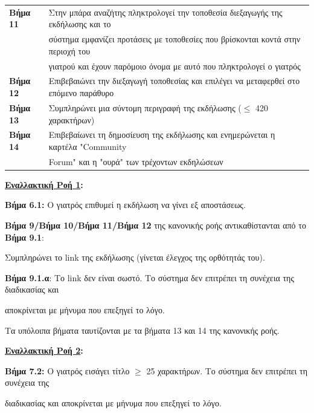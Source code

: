 \documentclass{article}
\newcommand\T{\rule{0pt}{2.6ex}}       %
\newcommand\B{\rule[-1.2ex]{0pt}{0pt}}
\begin{document}
\begin{center}
\begin{tabular}{|l|l|}
      \hline
       \textbf{Βήμα 11} & Στην μπάρα αναζήτης πληκτρολογεί την τοποθεσία διεξαγωγής της εκδήλωσης και το \T \\& σύστημα εμφανίζει προτάσεις με τοποθεσίες που βρίσκονται κοντά στην περιοχή του \\& γιατρού και έχουν παρόμοιο όνομα με αυτό που πληκτρολογεί ο γιατρός  \B \\
      \hline
       \textbf{Βήμα 12} & Επιβεβαιώνει την διεξαγωγή τοποθεσίας και επιλέγει να μεταφερθεί στο επόμενο παράθυρο\T\B \\
      \hline
       \textbf{Βήμα 13} & Συμπληρώνει μια σύντομη περιγραφή της εκδήλωσης ($\le$ 420 χαρακτήρων) \T\B \\
      \hline
       \textbf{Βήμα 14} & Επιβεβαίωνει τη δημοσίευση της εκδήλωσης και ενημερώνεται η καρτέλα "Community \T \\& Forum" και η "ουρά" των τρέχοντων εκδηλώσεων \B \\
      \hline
     \end{tabular}
 \end{center}
 
 \textbf{\underline{Εναλλακτική Ροή 1}:} \vspace{0.2cm}
\par \textbf{Βήμα 6.1:} Ο γιατρός επιθυμεί η εκδήλωση να γίνει εξ αποστάσεως.\vspace{0.1cm}

\textbf{Βήμα 9/Βήμα 10/Βήμα 11/Βήμα 12} της κανονικής ροής αντικαθίστανται από το \textbf{Βήμα 9.1}: \par Συμπληρώνει το link της εκδήλωσης (γίνεται έλεγχος της ορθότητάς του). \vspace{0.1cm}
\par \textbf{Βήμα 9.1.α}: Το link δεν είναι σωστό. Το σύστημα δεν επιτρέπει τη συνέχεια της διαδικασίας και \par αποκρίνεται με μήνυμα που επεξηγεί το λόγο. \vspace{0.1cm}

\par Τα υπόλοιπα βήματα ταυτίζονται με τα βήματα 13 και 14 της κανονικής ροής. \vspace{0.2cm}

\textbf{\underline{Εναλλακτική Ροή 2}:} \vspace{0.2cm}
\par \textbf{Βήμα 7.2:} Ο γιατρός εισάγει τίτλο $\ge$ 25 χαρακτήρων. Το σύστημα δεν επιτρέπει τη συνέχεια της \par διαδικασίας και αποκρίνεται με μήνυμα που επεξηγεί το λόγο. \vspace{0.2cm}
\end{document}
